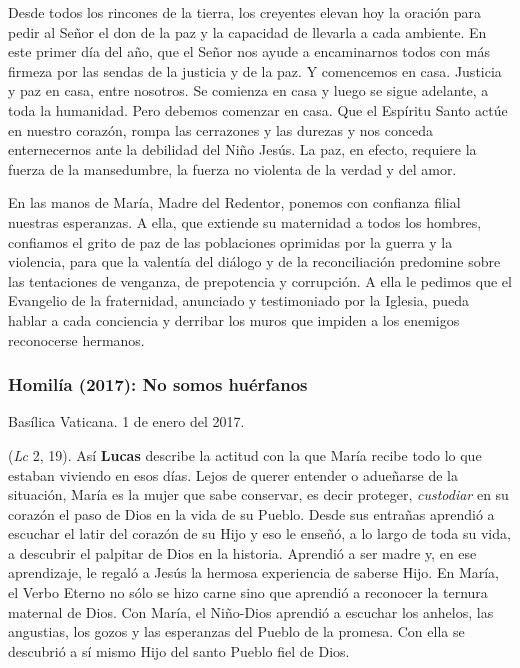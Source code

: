 Desde todos los rincones de la tierra, los creyentes elevan hoy la oración para pedir al Señor el don de la paz y la capacidad de llevarla a cada ambiente. En este primer día del año, que el Señor nos ayude a encaminarnos todos con más firmeza por las sendas de la justicia y de la paz. Y comencemos en casa. Justicia y paz en casa, entre nosotros. Se comienza en casa y luego se sigue adelante, a toda la humanidad. Pero debemos comenzar en casa. Que el Espíritu Santo actúe en nuestro corazón, rompa las cerrazones y las durezas y nos conceda enternecernos ante la debilidad del Niño Jesús. La paz, en efecto, requiere la fuerza de la mansedumbre, la fuerza no violenta de la verdad y del amor.

En las manos de María, Madre del Redentor, ponemos con confianza filial nuestras esperanzas. A ella, que extiende su maternidad a todos los hombres, confiamos el grito de paz de las poblaciones oprimidas por la guerra y la violencia, para que la valentía del diálogo y de la reconciliación predomine sobre las tentaciones de venganza, de prepotencia y corrupción. A ella le pedimos que el Evangelio de la fraternidad, anunciado y testimoniado por la Iglesia, pueda hablar a cada conciencia y derribar los muros que impiden a los enemigos reconocerse hermanos.

\subsubsection{Homilía (2017): No somos huérfanos}

Basílica Vaticana. 1 de enero del 2017.

 (\emph{Lc} 2, 19). Así \textbf{Lucas} describe la actitud con la que María recibe todo lo que estaban viviendo en esos días. Lejos de querer entender o adueñarse de la situación, María es la mujer que sabe conservar, es decir proteger, \emph{custodiar} en su corazón el paso de Dios en la vida de su Pueblo. Desde sus entrañas aprendió a escuchar el latir del corazón de su Hijo y eso le enseñó, a lo largo de toda su vida, a descubrir el palpitar de Dios en la historia. Aprendió a ser madre y, en ese aprendizaje, le regaló a Jesús la hermosa experiencia de saberse Hijo. En María, el Verbo Eterno no sólo se hizo carne sino que aprendió a reconocer la ternura maternal de Dios. Con María, el Niño-Dios aprendió a escuchar los anhelos, las angustias, los gozos y las esperanzas del Pueblo de la promesa. Con ella se descubrió a sí mismo Hijo del santo Pueblo fiel de Dios.

